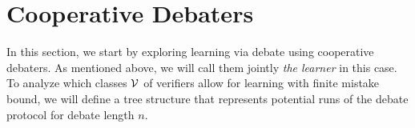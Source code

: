 \documentclass[anon]{alt2027} %
\begin{document}



















\section{Cooperative Debaters}
\label{sec:cooperative-case}
In this section, we start by exploring learning via debate using cooperative debaters. As mentioned above, we will call them jointly \emph{the learner} in this case. To analyze which classes ${\mathcal V}$ of verifiers allow for learning with finite mistake bound, we will define a tree structure that represents potential runs of the debate protocol for debate length $n$.
\end{document}
